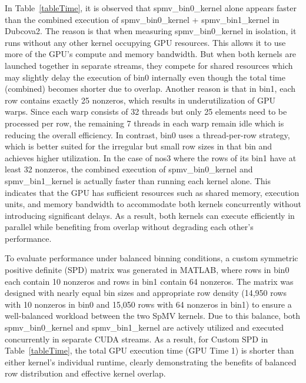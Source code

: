 \documentclass[conference]{IEEEtran}
\begin{document}
In Table~\ref{tableTime}, it is observed that spmv\_bin0\_kernel alone appears faster than the combined execution of spmv\_bin0\_kernel + spmv\_bin1\_kernel in Dubcova2. The reason is that when measuring spmv\_bin0\_kernel in isolation, it runs without any other kernel occupying GPU resources. This allows it to use more of the GPU's compute and memory bandwidth. But when both kernels are launched together in separate streams, they compete for shared resources which may slightly delay the execution of bin0 internally even though the total time (combined) becomes shorter due to overlap. Another reason is that in bin1, each row contains exactly 25 nonzeros, which results in underutilization of GPU warps. Since each warp consists of 32 threads but only 25 elements need to be processed per row, the remaining 7 threads in each warp remain idle which is reducing the overall efficiency. In contrast, bin0 uses a thread-per-row strategy, which is better suited for the irregular but small row sizes in that bin and achieves higher utilization. In the case of nos3 where the rows of its bin1 have at least 32 nonzeros, the combined execution of spmv\_bin0\_kernel and spmv\_bin1\_kernel is actually faster than running each kernel alone. This indicates that the GPU has sufficient resources such as shared memory, execution units, and memory bandwidth to accommodate both kernels concurrently without introducing significant delays. As a result, both kernels can execute efficiently in parallel while benefiting from overlap without degrading each other’s performance.

To evaluate performance under balanced binning conditions, a custom symmetric positive definite (SPD) matrix was generated in MATLAB, where rows in bin0 each contain 10 nonzeros and rows in bin1 contain 64 nonzeros. The matrix was designed with nearly equal bin sizes and appropriate row density (14,950 rows with 10 nonzeros in bin0 and 15,050 rows with 64 nonzeros in bin1) to ensure a well-balanced workload between the two SpMV kernels. Due to this balance, both spmv\_bin0\_kernel and spmv\_bin1\_kernel are actively utilized and executed concurrently in separate CUDA streams. As a result, for Custom SPD in Table~\ref{tableTime}, the total GPU execution time (GPU Time 1) is shorter than either kernel’s individual runtime, clearly demonstrating the benefits of balanced row distribution and effective kernel overlap.
\end{document}
